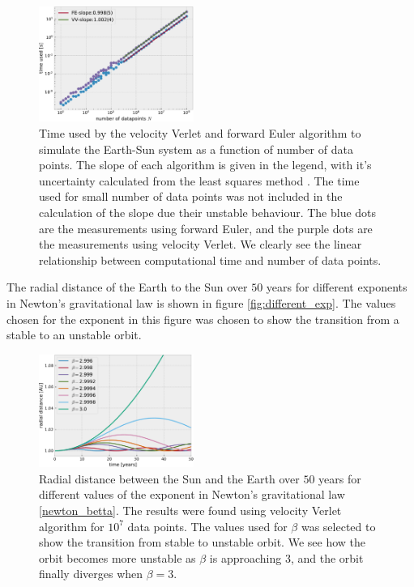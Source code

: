\documentclass[%
 reprint,
nofootinbib,
aps,
]{revtex4-1}
\begin{document}
\begin{figure}
  \centering
  \includegraphics[width=0.45\textwidth]{../figures/timer_VV_and_FE.pdf}
  \caption{Time used by the velocity Verlet and forward Euler algorithm to simulate the Earth-Sun system as a function of number of data points. The slope of each algorithm is given in the legend, with it's uncertainty calculated from the least squares method \cite{Squires}. The time used for small number of data points was not included in the calculation of the slope due their unstable behaviour. The blue dots are the measurements using forward Euler, and the purple dots are the measurements using velocity Verlet. We clearly see the linear relationship between computational time and number of data points.}
  \label{fig:time_relation}
\end{figure}

The radial distance of the Earth to the Sun over $50$ years for different exponents in Newton's gravitational law is shown in figure \vref{fig:different_exp}. The values chosen for the exponent in this figure was chosen to show the transition from a stable to an unstable orbit.

\begin{figure}
  \centering
  \includegraphics[width=0.45\textwidth]{../figures/betta_plot.pdf}
  \caption{Radial distance between the Sun and the Earth over $50$ years for different values of the exponent in Newton's gravitational law \eqref{newton_betta}. The results were found using velocity Verlet algorithm for $10^7$ data points. The values used for $\beta$ was selected to show the transition from stable to unstable orbit. We see how the orbit becomes more unstable as $\beta$ is approaching $3$, and the orbit finally diverges when $\beta=3$.}
  \label{fig:different_exp}
\end{figure}
\end{document}
